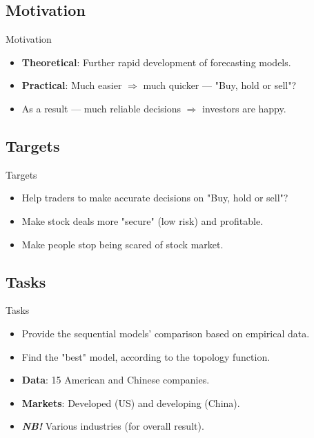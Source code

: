 \documentclass[11pt, aspectratio= 169]{beamer}
\begin{document}
	\subsection{Motivation}
	\begin{frame}{Motivation}
		\Large
		\begin{itemize}
			\item \textbf{Theoretical}: Further rapid development of forecasting models.
			\item \textbf{Practical}: Much easier $\Rightarrow$ much quicker --- "Buy, hold or sell"?
			\item[] As a result --- much reliable decisions $\Rightarrow$ investors are happy.
		\end{itemize}
	\end{frame}
	
	\subsection{Targets}
	\begin{frame}{Targets}
		\Large
		\begin{itemize}
			\item Help traders to make accurate decisions on "Buy, hold or sell"?
			\item Make stock deals more "secure" (low risk) and profitable.
			\item Make people stop being scared of stock market.
		\end{itemize}
	\end{frame}
	
	\subsection{Tasks}
	\begin{frame}{Tasks}
		\Large
		\begin{itemize}
			\item Provide the sequential models’ comparison based on empirical data.
			\item Find the "best" model, according to the topology function.
			\item \textbf{Data}: 15 American and Chinese companies.
			\item[] \textbf{Markets}: Developed (US) and developing (China).
			\item[] \textbf{\textit{NB!}} Various industries (for overall result). 
		\end{itemize}
	\end{frame}
	
\end{document}
